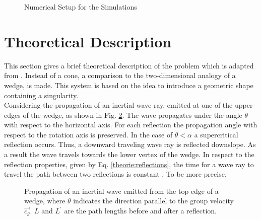 
\begin{figure}[!bp]
  \centering
      \caption{Numerical Setup for the Simulations \label{cone:setup_image} }
\end{figure}
\clearpage

\section{Theoretical Description}
\label{cone:theorie_theo}

This section gives a brief theoretical description of the problem which is adapted from \citep{Greenspan1969, Beardsley1970}.
Instead of a cone, a comparison to the two-dimensional analogy of a wedge, is made.
This system is based on the idea to introduce a geometric shape containing a singularity.\\
Considering the propagation of an inertial wave ray, emitted at one of the upper edges of
the wedge, as shown in Fig. \ref{cone:theorie}.
The wave propagates under the angle $\theta$ with respect to the horizontal axis.
For each reflection the propagation angle with respect to the rotation axis is preserved.
In the case of $\theta<\alpha$ a supercritical reflection occurs.
Thus, a downward traveling wave ray is reflected downslope.
As a result the wave travels towards the lower vertex of the wedge.
In respect to the reflection properties, given by Eq. \ref{theorie:reflections},
the time for a wave ray to travel the path between two reflections is constant \citep{Beardsley1970}.
To be more precise,

\begin{figure}[!bp]
  \begin{minipage}[c]{0.6\textwidth}
      \centering
  \end{minipage}
  \begin{minipage}[c]{0.3\textwidth}
      \caption{
          Propagation of an inertial wave emitted from the top edge of a wedge,
           where $\theta$ indicates the direction parallel to the group velocity
            $\vec{c_g}$.  $L$ and $L^{\prime}$ are the path lengths before and after a reflection.
      \label{cone:theorie}
      }
  \end{minipage}
\end{figure}



